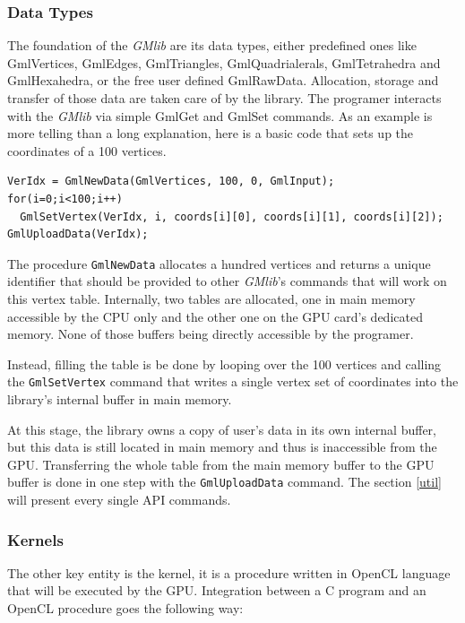 \documentclass[a4paper,12pt]{article}
\begin{document}
\subsubsection*{Data Types}
The foundation of the \emph{GMlib} are its data types, either predefined ones like GmlVertices, GmlEdges, GmlTriangles, GmlQuadrialerals, GmlTetrahedra and GmlHexahedra, or the free user defined GmlRawData. Allocation, storage and transfer of those data are taken care of by the library. The programer interacts with the \emph{GMlib} via simple GmlGet and GmlSet commands. As an example is more telling than a long explanation, here is a basic code that sets up the coordinates of a 100 vertices.

\begin{tt}
\begin{verbatim}
VerIdx = GmlNewData(GmlVertices, 100, 0, GmlInput);
for(i=0;i<100;i++)
  GmlSetVertex(VerIdx, i, coords[i][0], coords[i][1], coords[i][2]);
GmlUploadData(VerIdx);
\end{verbatim}
\end{tt}
\normalfont

The procedure {\tt GmlNewData} allocates a hundred vertices and returns a unique identifier that should be provided to other \emph{GMlib}'s commands that will work on this vertex table. Internally, two tables are allocated, one in main memory accessible by the CPU only and the other one on the GPU card's dedicated memory. None of those buffers being directly accessible by the programer.

Instead, filling the table is be done by looping over the 100 vertices and calling the {\tt GmlSetVertex} command that writes a single vertex set of coordinates into the library's internal buffer in main memory.

At this stage, the library owns a copy of user's data in its own internal buffer, but this data is still located in main memory and thus is inaccessible from the GPU. Transferring the whole table from the main memory buffer to the GPU buffer is done in one step with the {\tt GmlUploadData} command. The section \ref{util} will present every single API commands.

\subsubsection*{Kernels}
The other key entity is the kernel, it is a procedure written in OpenCL language that will be executed by the GPU. Integration between a C program and an OpenCL procedure goes the following way:
\end{document}
